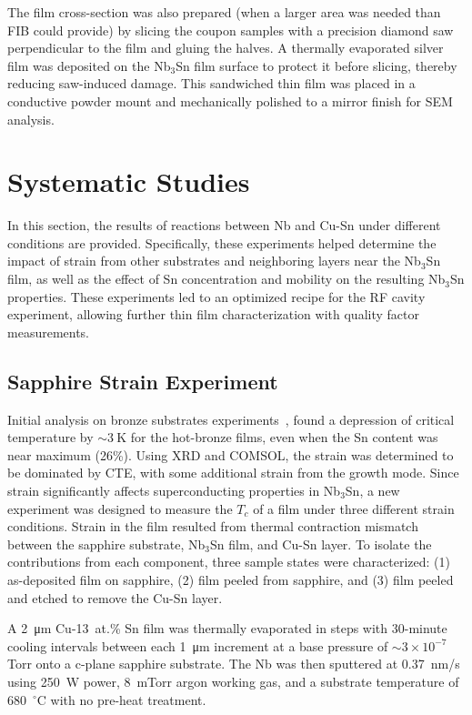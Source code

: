         The film cross-section was also prepared (when a larger area was needed than FIB could provide) by slicing the coupon samples with a precision diamond saw perpendicular to the film and gluing the halves. A thermally evaporated silver film was deposited on the Nb$_3$Sn film surface to protect it before slicing, thereby reducing saw-induced damage. This sandwiched thin film was placed in a conductive powder mount and mechanically polished to a mirror finish for SEM analysis.

\section{Systematic Studies}

    In this section, the results of reactions between Nb and Cu-Sn under different conditions are provided. Specifically, these experiments helped determine the impact of strain from other substrates and neighboring layers near the Nb$_3$Sn film, as well as the effect of Sn concentration and mobility on the resulting Nb$_3$Sn properties. These experiments led to an optimized recipe for the RF cavity experiment, allowing further thin film characterization with quality factor measurements.

    \subsection{Sapphire Strain Experiment}\label{sec:SapphireExp}

    Initial analysis on bronze substrates experiments~\cite{withanageRapidNbSn2021}, found a depression of critical temperature by $\sim3~$K for the hot-bronze films, even when the Sn content was near maximum (26\%). Using XRD and COMSOL, the strain was determined to be dominated by CTE, with some additional strain from the growth mode. Since strain significantly affects superconducting properties in Nb$_3$Sn, a new experiment was designed to measure the $T_c$ of a film under three different strain conditions. Strain in the film resulted from thermal contraction mismatch between the sapphire substrate, Nb$_3$Sn film, and Cu-Sn layer. To isolate the contributions from each component, three sample states were characterized: (1) as-deposited film on sapphire, (2) film peeled from sapphire, and (3) film peeled and etched to remove the Cu-Sn layer.

    A 2~\unit{\um} Cu-13~at.\% Sn film was thermally evaporated in steps with 30-minute cooling intervals between each 1~\unit{\um} increment at a base pressure of $\sim3\times10^{-7}$ Torr onto a c-plane sapphire substrate. The Nb was then sputtered at 0.37~nm/s using 250~W power, 8~mTorr argon working gas, and a substrate temperature of 680~$^\circ$C with no pre-heat treatment.

